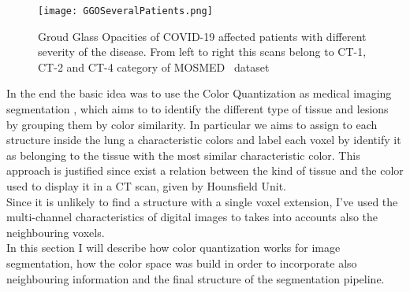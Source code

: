 	\begin{figure}[h!]
		\centering
			\texttt{[image: GGOSeveralPatients.png]}
		\caption{Groud Glass Opacities of COVID-19 affected patients with different severity of the disease. From left to right this scans belong to CT-1, CT-2 and CT-4 category of MOSMED~\cite{DATA:MOSMED} dataset}
	\label{fig:GGO-Spatial}
	\end{figure}
	
	In the end the basic idea was to use the Color Quantization as medical imaging segmentation , which aims to to identify the different type of tissue and lesions by grouping them by color similarity. In particular we aims to assign to each structure inside the lung a characteristic colors and label each voxel by identify it as belonging to the tissue with the most similar characteristic color. This approach is justified since exist a relation between the kind of tissue and the color used to display it in a CT scan, given by Hounsfield Unit.\\
	Since it is unlikely to find a structure with a single voxel extension, I've used the multi-channel characteristics of digital images to takes into accounts also the neighbouring voxels.\\
	
	In this section I will describe how color quantization works for image segmentation, how the color space was build in order to incorporate also neighbouring information and the final structure of the segmentation pipeline.

